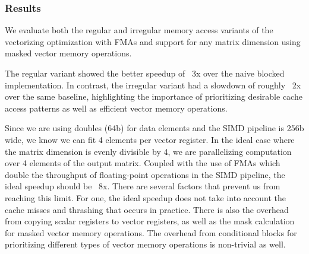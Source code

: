 \subsubsection{Results}

We evaluate both the regular and irregular memory access variants of the
vectorizing optimization with FMAs and support for any matrix dimension
using masked vector memory operations.
\smallskip

The regular variant showed the better speedup of ~3x over the naive
blocked implementation. In contrast, the irregular variant had a slowdown
of roughly ~2x over the same baseline, highlighting the importance of
prioritizing desirable cache access patterns as well as efficient vector
memory operations.
\smallskip

Since we are using doubles (64b) for data elements and the SIMD pipeline
is 256b wide, we know we can fit 4 elements per vector register. In the
ideal case where the matrix dimension is evenly divisible by 4, we are
parallelizing computation over 4 elements of the output matrix. Coupled
with the use of FMAs which double the throughput of floating-point
operations in the SIMD pipeline, the ideal speedup should be ~8x. There
are several factors that prevent us from reaching this limit. For one,
the ideal speedup does not take into account the cache misses and
thrashing that occurs in practice. There is also the overhead from
copying scalar registers to vector registers, as well as the mask
calculation for masked vector memory operations. The overhead from
conditional blocks for prioritizing different types of vector memory
operations is non-trivial as well.
